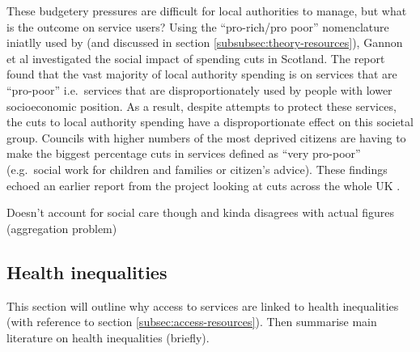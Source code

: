 \documentclass[12pt,]{report}
\begin{document}
These budgetery pressures are difficult for local authorities to manage,
but what is the outcome on service users? Using the ``pro-rich/pro
poor'' nomenclature iniatlly used by \citep{RN440} (and discussed in
section \ref{subsubsec:theory-resources}), Gannon et al
\citeyearpar{RN235} investigated the social impact of spending cuts in
Scotland. The report found that the vast majority of local authority
spending is on services that are ``pro-poor'' i.e.~services that are
disproportionately used by people with lower socioeconomic position. As
a result, despite attempts to protect these services, the cuts to local
authority spending have a disproportionate effect on this societal
group. Councils with higher numbers of the most deprived citizens are
having to make the biggest percentage cuts in services defined as ``very
pro-poor'' (e.g.~social work for children and families or citizen's
advice). These findings echoed an earlier report from the project
looking at cuts across the whole UK \citep{RN117}.

Doesn't account for social care though and kinda disagrees with actual
figures (aggregation problem)

\subsection{Health inequalities}\label{subsec:health-inequals}

This section will outline why access to services are linked to health
inequalities (with reference to section \ref{subsec:access-resources}).
Then summarise main literature on health inequalities (briefly).
\end{document}
